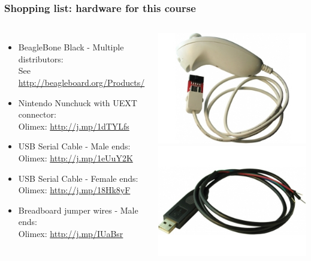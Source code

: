 \begin{frame}
\frametitle{Shopping list: hardware for this course}
  \begin{columns}
    \footnotesize
    \begin{itemize}
      \item BeagleBone Black - Multiple distributors: \\
	    See \url{http://beagleboard.org/Products/}
      \item Nintendo Nunchuck with UEXT connector: \\
            Olimex: \url{http://j.mp/1dTYLfs}
      \item USB Serial Cable - Male ends: \\
	    Olimex: \url{http://j.mp/1eUuY2K}
      \item USB Serial Cable - Female ends: \\
	    Olimex: \url{http://j.mp/18Hk8yF}
      \item Breadboard jumper wires - Male ends: \\
	    Olimex: \url{http://j.mp/IUaBsr}
    \end{itemize}
    \includegraphics[height=0.25\textheight]{slides/kernel-shopping-list/nunchuk.jpg} \\
    \includegraphics[height=0.20\textheight]{slides/kernel-shopping-list/usb-serial-cable-male.jpg} \\

\end{columns}
\end{frame}
